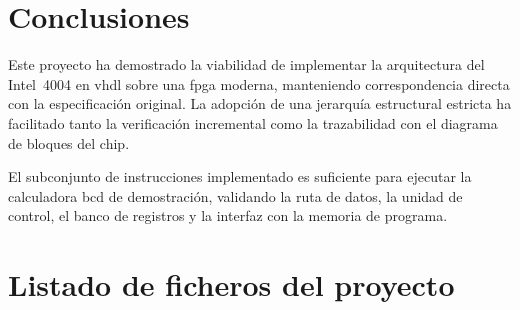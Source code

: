 \documentclass[%
    school=etsisi,%
    type=pfg,%
    degree=61CI,%
]{upm-report}
\begin{document}
\chapter{Conclusiones}
\label{ch:conclusiones}


Este proyecto ha demostrado la viabilidad de implementar la arquitectura del
Intel~4004 en \acrshort{vhdl} sobre una \acrshort{fpga} moderna, manteniendo
correspondencia directa con la especificación original.  La adopción de una
jerarquía estructural estricta ha facilitado tanto la verificación incremental
como la trazabilidad con el diagrama de bloques del chip.

El subconjunto de instrucciones implementado es suficiente para ejecutar la
calculadora \acrshort{bcd} de demostración, validando la ruta de datos, la
unidad de control, el banco de registros y la interfaz con la memoria de
programa.

\appendix

\chapter{Listado de ficheros del proyecto}
\label{ch:ficheros}
\end{document}
